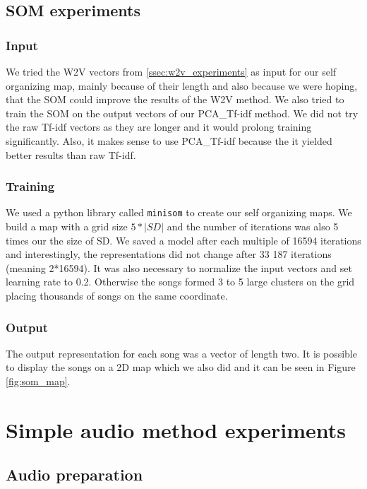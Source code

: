 \subsection{SOM experiments}\label{ssec:som_experiments}

\subsubsection{Input}
We tried the W2V vectors from \ref{ssec:w2v_experiments} as input for our self organizing map, mainly because of their length and also because we were hoping, that the SOM could improve the results of the W2V method. We also tried to train the SOM on the output vectors of our PCA\_Tf-idf method. We did not try the raw Tf-idf vectors as they are longer and it would prolong training significantly. Also, it makes sense to use PCA\_Tf-idf because the it yielded better results than raw Tf-idf.

\subsubsection{Training}
We used a python library called \texttt{minisom} \cite{Vettigli2019} to create our self organizing maps. We build a map with a grid size $5*|SD|$ and the number of iterations was also 5 times our the size of SD. We saved a model after each multiple of 16594 iterations and interestingly, the representations did not change after 33 187 iterations (meaning 2*16594). It was also necessary to normalize the input vectors and set learning rate to 0.2. Otherwise the songs formed 3 to 5 large clusters on the grid placing thousands of songs on the same coordinate. 

\subsubsection{Output}
The output representation for each song was a vector of length two. It is possible to display the songs on a 2D map which we also did and it can be seen in Figure \ref{fig:som_map}. 

\section{Simple audio method experiments}\label{sec:simple_audio_experiments}

\subsection{Audio preparation}\label{ssec:audio_prep}

